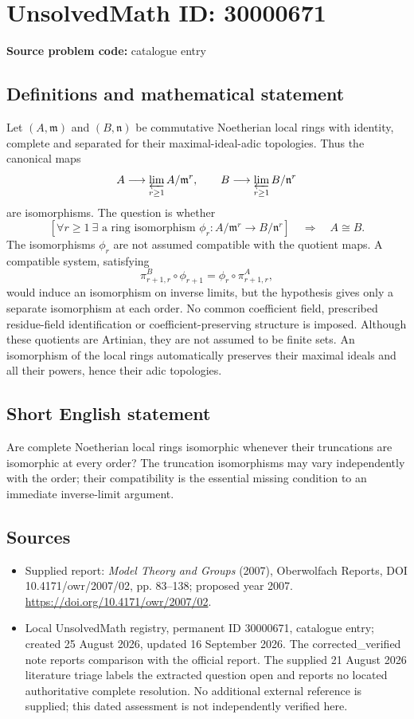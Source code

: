 \documentclass[11pt]{article}
\begin{document}
\section*{UnsolvedMath ID: 30000671}
\textbf{Source problem code:} catalogue entry
\subsection{Definitions and mathematical statement}
Let $(A,\mathfrak m)$ and $(B,\mathfrak n)$ be commutative Noetherian local rings with identity, complete and separated for their maximal-ideal-adic topologies. Thus the canonical maps
\[
A\longrightarrow\varprojlim_{r\geq1}A/\mathfrak m^r,
\qquad
B\longrightarrow\varprojlim_{r\geq1}B/\mathfrak n^r
\]
are isomorphisms. The question is whether
\[
\left[\forall r\geq1\ \exists\text{ a ring isomorphism }
\phi_r:A/\mathfrak m^r\longrightarrow B/\mathfrak n^r\right]
\quad\Longrightarrow\quad A\cong B.
\]
The isomorphisms $\phi_r$ are not assumed compatible with the quotient maps. A compatible system, satisfying
\[
\pi^B_{r+1,r}\circ\phi_{r+1}
=\phi_r\circ\pi^A_{r+1,r},
\]
would induce an isomorphism on inverse limits, but the hypothesis gives only a separate isomorphism at each order. No common coefficient field, prescribed residue-field identification or coefficient-preserving structure is imposed. Although these quotients are Artinian, they are not assumed to be finite sets. An isomorphism of the local rings automatically preserves their maximal ideals and all their powers, hence their adic topologies.
\subsection{Short English statement}
Are complete Noetherian local rings isomorphic whenever their truncations are isomorphic at every order? The truncation isomorphisms may vary independently with the order; their compatibility is the essential missing condition to an immediate inverse-limit argument.
\subsection{Sources}
\begin{itemize}
\item Supplied report: \emph{Model Theory and Groups} (2007), Oberwolfach Reports, DOI 10.4171/owr/2007/02, pp. 83--138; proposed year 2007. \url{https://doi.org/10.4171/owr/2007/02}.
\item Local UnsolvedMath registry, permanent ID 30000671, catalogue entry; created 25 August 2026, updated 16 September 2026. The corrected\_verified note reports comparison with the official report. The supplied 21 August 2026 literature triage labels the extracted question open and reports no located authoritative complete resolution. No additional external reference is supplied; this dated assessment is not independently verified here.
\end{itemize}
\end{document}
